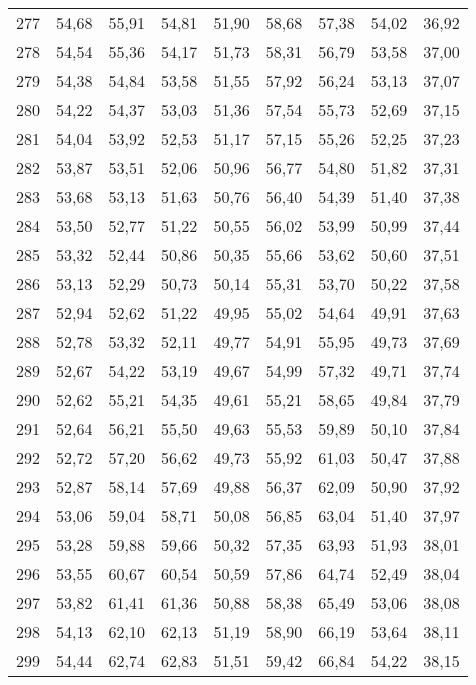 \begin{longtable}{c c c c c c c c c}
      277& 	54,68& 	55,91& 	54,81& 	51,90& 	58,68& 	57,38& 	54,02& 	36,92 \\
      278& 	54,54& 	55,36& 	54,17& 	51,73& 	58,31& 	56,79& 	53,58& 	37,00 \\
      279& 	54,38& 	54,84& 	53,58& 	51,55& 	57,92& 	56,24& 	53,13& 	37,07 \\
      280& 	54,22& 	54,37& 	53,03& 	51,36& 	57,54& 	55,73& 	52,69& 	37,15 \\
      281& 	54,04& 	53,92& 	52,53& 	51,17& 	57,15& 	55,26& 	52,25& 	37,23 \\
      282& 	53,87& 	53,51& 	52,06& 	50,96& 	56,77& 	54,80& 	51,82& 	37,31 \\
      283& 	53,68& 	53,13& 	51,63& 	50,76& 	56,40& 	54,39& 	51,40& 	37,38 \\
      284& 	53,50& 	52,77& 	51,22& 	50,55& 	56,02& 	53,99& 	50,99& 	37,44 \\
      285& 	53,32& 	52,44& 	50,86& 	50,35& 	55,66& 	53,62& 	50,60& 	37,51 \\
      286& 	53,13& 	52,29& 	50,73& 	50,14& 	55,31& 	53,70& 	50,22& 	37,58 \\
      287& 	52,94& 	52,62& 	51,22& 	49,95& 	55,02& 	54,64& 	49,91& 	37,63 \\
      288& 	52,78& 	53,32& 	52,11& 	49,77& 	54,91& 	55,95& 	49,73& 	37,69 \\
      289& 	52,67& 	54,22& 	53,19& 	49,67& 	54,99& 	57,32& 	49,71& 	37,74 \\
      290& 	52,62& 	55,21& 	54,35& 	49,61& 	55,21& 	58,65& 	49,84& 	37,79 \\
      291& 	52,64& 	56,21& 	55,50& 	49,63& 	55,53& 	59,89& 	50,10& 	37,84 \\
      292& 	52,72& 	57,20& 	56,62& 	49,73& 	55,92& 	61,03& 	50,47& 	37,88 \\
      293& 	52,87& 	58,14& 	57,69& 	49,88& 	56,37& 	62,09& 	50,90& 	37,92 \\
      294& 	53,06& 	59,04& 	58,71& 	50,08& 	56,85& 	63,04& 	51,40& 	37,97 \\
      295& 	53,28& 	59,88& 	59,66& 	50,32& 	57,35& 	63,93& 	51,93& 	38,01 \\
      296& 	53,55& 	60,67& 	60,54& 	50,59& 	57,86& 	64,74& 	52,49& 	38,04 \\
      297& 	53,82& 	61,41& 	61,36& 	50,88& 	58,38& 	65,49& 	53,06& 	38,08 \\
      298& 	54,13& 	62,10& 	62,13& 	51,19& 	58,90& 	66,19& 	53,64& 	38,11 \\
      299& 	54,44& 	62,74& 	62,83& 	51,51& 	59,42& 	66,84& 	54,22& 	38,15 \\

\end{longtable}
